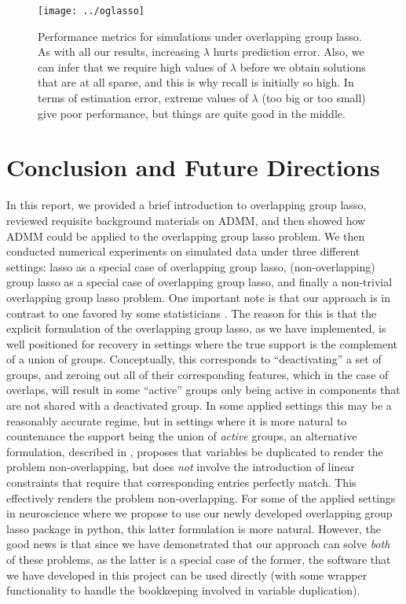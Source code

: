 \documentclass{article}
\begin{document}
\begin{figure}[h]
  \centering
  \texttt{[image: ../oglasso]}
  \caption{Performance metrics for simulations under overlapping group lasso.
As with all our results, increasing $\lambda$ hurts prediction error. Also, we can infer that we require high values of $\lambda$  before we obtain solutions that are at all sparse, and this is why recall is initially so high. In terms of estimation error, extreme values of $\lambda$ (too big or too small) give poor performance, but things are quite good in the middle.}
  \label{fig:oglasso}
\end{figure}

\section{Conclusion and Future Directions}
\label{sec:concl-future-direct}
In this report, we provided a brief introduction to overlapping group lasso, reviewed requisite background materials on ADMM, and then showed how ADMM could be applied to the overlapping group lasso problem.
We then conducted numerical experiments on simulated data under three different settings: lasso as a special case of overlapping group lasso, (non-overlapping) group lasso as a special case of overlapping group lasso, and finally a non-trivial overlapping group lasso problem.
One important note is that our approach is in contrast to one favored by some statisticians \cite{obozinski_group_2011,jacob_group_2009}.
The reason for this is that the explicit formulation of the overlapping group lasso, as we have implemented, 
is well positioned for recovery in settings where the true support is the complement of a union of groups.
Conceptually, this corresponds to ``deactivating'' a set of groups, and zeroing out all of their corresponding features, which in the case of overlaps, will result in some ``active'' groups only being active in components that are not shared with a deactivated group.
In some applied settings this may be a reasonably accurate regime, but in settings where it is more natural to countenance the support being the union of \emph{active} groups, an alternative formulation, described in \cite{obozinski_group_2011,jacob_group_2009}, proposes that variables be duplicated to render the problem non-overlapping, but does \emph{not} involve the introduction of linear constraints that require that corresponding entries perfectly match.
This effectively renders the problem non-overlapping.
For some of the applied settings in neuroscience where we propose to use our newly developed overlapping group lasso package in python, this latter formulation is more natural.
However, the good news is that since we have demonstrated that our approach can solve \emph{both} of these problems, as the latter is a special case of the former, the software that we have developed in this project can be used directly (with some wrapper functionality to handle the bookkeeping involved in variable duplication).
\end{document}
